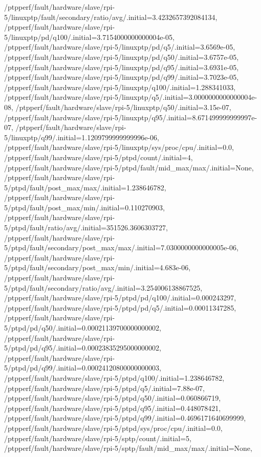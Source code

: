{    /ptpperf/fault/hardware/slave/rpi-5/linuxptp/fault/secondary/ratio/avg/.initial=3.4232657392084134,
    /ptpperf/fault/hardware/slave/rpi-5/linuxptp/pd/q100/.initial=3.7154000000000004e-05,
    /ptpperf/fault/hardware/slave/rpi-5/linuxptp/pd/q5/.initial=3.6569e-05,
    /ptpperf/fault/hardware/slave/rpi-5/linuxptp/pd/q50/.initial=3.6757e-05,
    /ptpperf/fault/hardware/slave/rpi-5/linuxptp/pd/q95/.initial=3.6931e-05,
    /ptpperf/fault/hardware/slave/rpi-5/linuxptp/pd/q99/.initial=3.7023e-05,
    /ptpperf/fault/hardware/slave/rpi-5/linuxptp/q100/.initial=1.288341033,
    /ptpperf/fault/hardware/slave/rpi-5/linuxptp/q5/.initial=3.0000000000000004e-08,
    /ptpperf/fault/hardware/slave/rpi-5/linuxptp/q50/.initial=3.15e-07,
    /ptpperf/fault/hardware/slave/rpi-5/linuxptp/q95/.initial=8.671499999999997e-07,
    /ptpperf/fault/hardware/slave/rpi-5/linuxptp/q99/.initial=1.1209799999999996e-06,
    /ptpperf/fault/hardware/slave/rpi-5/linuxptp/sys/proc/cpu/.initial=0.0,
    /ptpperf/fault/hardware/slave/rpi-5/ptpd/count/.initial=4,
    /ptpperf/fault/hardware/slave/rpi-5/ptpd/fault/mid_max/max/.initial=None,
    /ptpperf/fault/hardware/slave/rpi-5/ptpd/fault/post_max/max/.initial=1.238646782,
    /ptpperf/fault/hardware/slave/rpi-5/ptpd/fault/post_max/min/.initial=0.110270903,
    /ptpperf/fault/hardware/slave/rpi-5/ptpd/fault/ratio/avg/.initial=351526.3606303727,
    /ptpperf/fault/hardware/slave/rpi-5/ptpd/fault/secondary/post_max/max/.initial=7.0300000000000005e-06,
    /ptpperf/fault/hardware/slave/rpi-5/ptpd/fault/secondary/post_max/min/.initial=4.683e-06,
    /ptpperf/fault/hardware/slave/rpi-5/ptpd/fault/secondary/ratio/avg/.initial=3.254006138867525,
    /ptpperf/fault/hardware/slave/rpi-5/ptpd/pd/q100/.initial=0.000243297,
    /ptpperf/fault/hardware/slave/rpi-5/ptpd/pd/q5/.initial=0.00011347285,
    /ptpperf/fault/hardware/slave/rpi-5/ptpd/pd/q50/.initial=0.00021139700000000002,
    /ptpperf/fault/hardware/slave/rpi-5/ptpd/pd/q95/.initial=0.00023835295000000002,
    /ptpperf/fault/hardware/slave/rpi-5/ptpd/pd/q99/.initial=0.00024120800000000003,
    /ptpperf/fault/hardware/slave/rpi-5/ptpd/q100/.initial=1.238646782,
    /ptpperf/fault/hardware/slave/rpi-5/ptpd/q5/.initial=7.88e-07,
    /ptpperf/fault/hardware/slave/rpi-5/ptpd/q50/.initial=0.060866719,
    /ptpperf/fault/hardware/slave/rpi-5/ptpd/q95/.initial=0.448078421,
    /ptpperf/fault/hardware/slave/rpi-5/ptpd/q99/.initial=0.4696171640699999,
    /ptpperf/fault/hardware/slave/rpi-5/ptpd/sys/proc/cpu/.initial=0.0,
    /ptpperf/fault/hardware/slave/rpi-5/sptp/count/.initial=5,
    /ptpperf/fault/hardware/slave/rpi-5/sptp/fault/mid_max/max/.initial=None,
}
